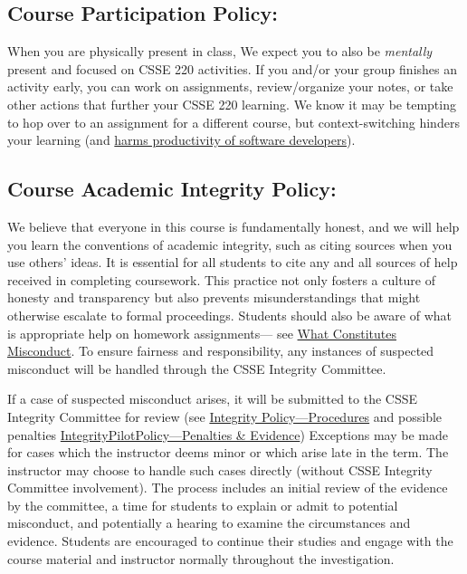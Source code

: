 \subsection*{Course Participation Policy:}
When you are physically present in class, 
We expect you to also be \emph{mentally} present and focused on CSSE 220 activities. 
If you and/or your group finishes an activity early, 
you can work on assignments, review/organize your notes, or 
take other actions that further your CSSE 220 learning. 
We know it may be tempting to hop over to an assignment for a different course, 
but context-switching hinders your learning 
(and \href{https://dl.acm.org/doi/pdf/10.1145/3084100.3084116}{harms productivity of software developers}). 


\subsection*{Course Academic Integrity Policy:}
We believe that everyone in this course is fundamentally honest, 
and we will help you learn the conventions of academic integrity,  
such as citing sources when you use others' ideas. 
It is essential for all students to cite any and all sources of help 
received in completing coursework. 
This practice not only fosters a culture of honesty and transparency but also 
prevents misunderstandings that might otherwise escalate to formal proceedings. 
Students should also be aware of what is appropriate help on homework assignments---%
see 
\href{https://rosehulman.sharepoint.com/:w:/r/sites/CS/Shared%20Documents/Pilot%20Integrity%20Policy/IntegrityPilotPolicy%20-%20What%20Constitutes%20Misconduct.docx?d=w72d3dc4b233d4df68e10736359a06c80&csf=1&web=1&e=QWvFcM}
{What Constitutes Misconduct}. 
To ensure fairness and responsibility, 
any instances of suspected misconduct will be handled through the CSSE Integrity Committee. 

If a case of suspected misconduct arises, 
it will be submitted to the CSSE Integrity Committee for review 
(see 
\href{https://rosehulman.sharepoint.com/:w:/r/sites/CS/Shared%20Documents/Integrity%20Policy/Integrity%20Policy%20-%20Procedures%20-%20rev%2004-27-2026.docx?d=w919879b57499452894ee53ed1a267eac&csf=1&web=1&e=rnHf8y}{Integrity Policy---Procedures} 
and possible penalties 
\href{https://rosehulman.sharepoint.com/:w:/s/CS/IQA8KW6RGqOTRL291reO0tPdAfY1xviT03qG5Tcyx1hu6Ok?e=ewVAIx}{IntegrityPilotPolicy---Penalties \& Evidence}) 
Exceptions may be made for cases which the instructor deems minor 
or which arise late in the term. 
The instructor may choose to handle such cases directly 
(without CSSE Integrity Committee involvement). 
The process includes an initial review of the evidence by the committee, 
a time for students to explain or admit to potential misconduct, and 
potentially a hearing to examine the circumstances and evidence. 
Students are encouraged to continue their studies and 
engage with the course material and instructor normally 
throughout the investigation. 

